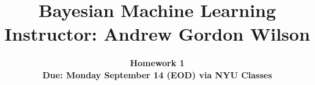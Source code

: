 \documentclass[11pt]{article}
\title{\vspace{-20mm} Bayesian Machine Learning \\ \vspace{5mm}  \normalsize Instructor: Andrew Gordon Wilson}
\date{}
\author{
\textbf{Homework 1} \\ \textbf{Due: Monday September 14 (EOD) via NYU Classes} }
\newcommand{\mbf}[1]{{\boldsymbol{\mathbf{#1}}}}
\renewcommand{\bm}{\mbf}
\newenvironment{solution}{\bigskip\noindent
                          \textbf{Solution}}
\begin{document}
\maketitle

Show all steps, and any code used to answer the questions.

\begin{enumerate}
\item Suppose we have data $ = \{(x_i, y_i)\}_{i=1}^{n}$, and $n$ is the total number
of training points.  Assume we want to learn the regression model

\begin{align}
y = a x  + \epsilon \,,  \label{eqn: first}
\end{align}

where $\epsilon$ is independent zero mean Gaussian noise with variance $\sigma^2$: 

$\epsilon \sim {}(0,\sigma^2)$.

\begin{enumerate}[label=(\alph*)]
    
    \item (2 marks): Let $\bm{y} = (y_1,\dots,y_n)^{\top}$ and $X = \{x_i\}_{i=1}^{n}$.  Derive the 
    log likelihood for the whole training set, $\log p(\bm{y} | X, a, \sigma^2)$.

    \begin{solution}
        $$
        p(y | X, a, \sigma^2) = (y | a X, \sigma^2)
        $$

        $$
        p(\bm{y} | X, a, \sigma^2) = \prod_{i=1}^{n} (\bm{y} | a X, \sigma^2)
        $$

        $$
        p(\bm{y} | X, a, \sigma^2) = \prod_{i=1}^{n} (y_i | a x_i, \sigma^2)
        $$

        $$
        \log p(\bm{y} | X, a, \sigma^2) = -  \log (\sigma^2)
                                          -  \log (2 \pi)
                                          -  \sum_{i=1}^{n} (y_i - ax_i)^2
        $$

        $$\square$$
    \end{solution}
    
    \item (2 marks): Given data $ = \{(4,21), (9,59), (7,25), (15,127)\}$, find the maximum
    likelihood solutions for $a$ and $\sigma^2$.

    \begin{solution}
        To find the maximum likelihood, we take the gradient of the following:


\end{solution}
\end{enumerate}
\end{enumerate}
\end{document}
